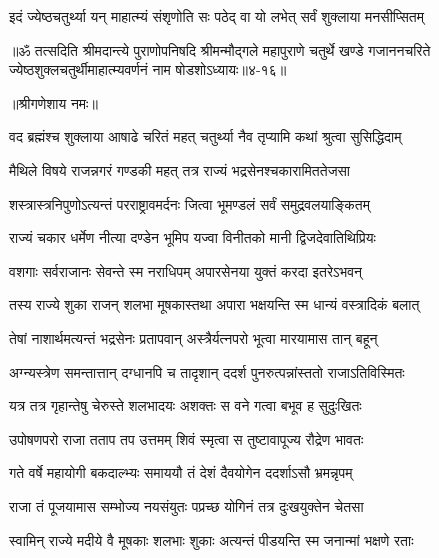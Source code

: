 \twolineshloka
{इदं ज्येष्ठचतुर्थ्या यन् माहात्म्यं संश‍ृणोति सः}
{पठेद् वा यो लभेत् सर्वं शुक्लाया मनसीप्सितम्} %

॥ॐ तत्सदिति श्रीमदान्त्ये पुराणोपनिषदि श्रीमन्मौद्गले महापुराणे चतुर्थे खण्डे गजाननचरिते ज्येष्ठशुक्लचतुर्थीमाहात्म्यवर्णनं नाम षोडशोऽध्यायः॥४-१६॥


\label{sec:ashadha-shukla-chaturthi-mahatmya-varnanam}

\centerline{॥श्रीगणेशाय नमः॥}


\twolineshloka
{वद ब्रह्मंश्च शुक्लाया आषाढे चरितं महत्}
{चतुर्थ्या नैव तृप्यामि कथां श्रुत्वा सुसिद्धिदाम्} %


\twolineshloka
{मैथिले विषये राजन्नगरं गण्डकी महत्}
{तत्र राज्यं भद्रसेनश्चकारामिततेजसा} %

\twolineshloka
{शस्त्रास्त्रनिपुणोऽत्यन्तं परराष्ट्रावमर्दनः}
{जित्वा भूमण्डलं सर्वं समुद्रवलयाङ्कितम्} %

\twolineshloka
{राज्यं चकार धर्मेण नीत्या दण्डेन भूमिप}
{यज्वा विनीतको मानी द्विजदेवातिथिप्रियः} %

\twolineshloka
{वशगाः सर्वराजानः सेवन्ते स्म नराधिपम्}
{अपारसेनया युक्तं करदा इतरेऽभवन्} %

\twolineshloka
{तस्य राज्ये शुका राजन् शलभा मूषकास्तथा}
{अपारा भक्षयन्ति स्म धान्यं वस्त्रादिकं बलात्} %

\twolineshloka
{तेषां नाशार्थमत्यन्तं भद्रसेनः प्रतापवान्}
{अस्त्रैर्यत्नपरो भूत्वा मारयामास तान् बहून्} %

\twolineshloka
{अग्न्यस्त्रेण समन्तात्तान् दग्धानपि च तादृशान्}
{ददर्श पुनरुत्पन्नांस्ततो राजाऽतिविस्मितः} %

\twolineshloka
{यत्र तत्र गृहान्तेषु चेरुस्ते शलभादयः}
{अशक्तः स वने गत्वा बभूव ह सुदुःखितः} %

\twolineshloka
{उपोषणपरो राजा तताप तप उत्तमम्}
{शिवं स्मृत्वा स तुष्टावापूज्य रौद्रेण भावतः} %

\twolineshloka
{गते वर्षे महायोगी बकदाल्भ्यः समाययौ}
{तं देशं दैवयोगेन ददर्शाऽसौ भ्रमन्नृपम्} %

\twolineshloka
{राजा तं पूजयामास सम्भोज्य नयसंयुतः}
{पप्रच्छ योगिनं तत्र दुःखयुक्तेन चेतसा} %


\twolineshloka
{स्वामिन् राज्ये मदीये वै मूषकाः शलभाः शुकाः}
{अत्यन्तं पीडयन्ति स्म जनान्मां भक्षणे रताः} %

